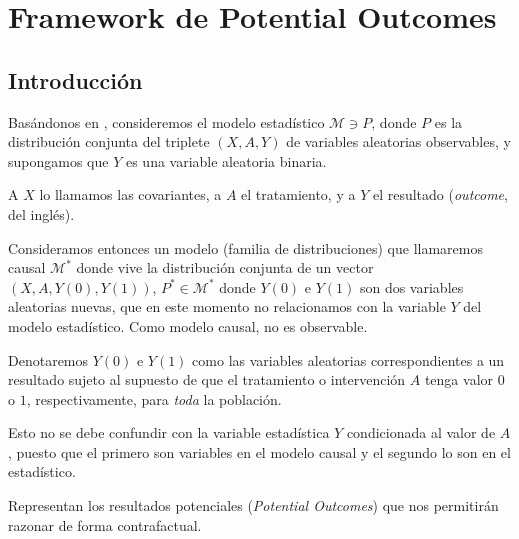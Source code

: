 \chapter{Framework de Potential Outcomes}

\section{Introducción}
Basándonos en \cite[capítulo 2]{targetedLearning}, consideremos el modelo estadístico $\mathcal{M} \ni P$,
donde $P$ es la distribución conjunta del triplete $(X, A, Y)$
de variables aleatorias observables, y supongamos que $Y$ es una variable aleatoria binaria.

A $X$ lo llamamos las covariantes, a $A$ el tratamiento, y a $Y$ el resultado (\textit{outcome}, del inglés).

Consideramos entonces un modelo (familia de distribuciones) que llamaremos causal $\mathcal{M}^*$
donde vive la distribución conjunta de un vector $(X, A, Y(0), Y(1))$,
$P^* \in \mathcal{M}^*$ donde $Y(0)$ e $Y(1)$ son dos variables aleatorias nuevas,
que en este momento no relacionamos con la variable $Y$ del modelo estadístico.
Como modelo causal, no es observable.

\begin{notac}
	Denotaremos $Y(0)$ e $Y(1)$ como las variables aleatorias correspondientes a un resultado
	sujeto al supuesto de que el tratamiento o intervención $A$ tenga valor $0$ o $1$,
	respectivamente, para \emph{toda} la población.

	Esto no se debe confundir con la variable estadística $Y$ condicionada al valor de $A$,
	puesto que el primero son variables en el modelo causal y el segundo lo son en el estadístico.

	Representan los resultados potenciales (\textit{Potential Outcomes}) que nos permitirán
	razonar de forma contrafactual.
\end{notac}

